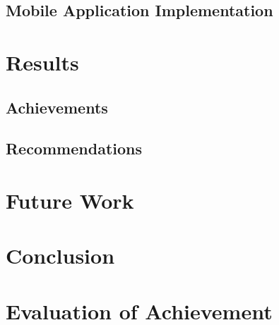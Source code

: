 \documentclass{article}
\begin{document}
		\subsection{Mobile Application Implementation}
	
	\section{Results}
		\subsection{Achievements}

		\subsection{Recommendations}
		
	\section{Future Work}

	
	\section{Conclusion}

		
	\section{Evaluation of Achievement}
		
		
	
	
		
\end{document}
